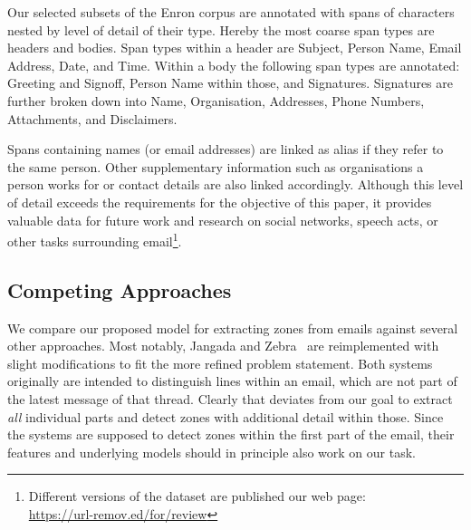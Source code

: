 \documentclass{llncs}
\begin{document}
Our selected subsets of the Enron corpus are annotated with spans of characters nested by level of detail of their type.
Hereby the most coarse span types are headers and bodies.
Span types within a header are Subject, Person Name, Email Address, Date, and Time.
Within a body the following span types are annotated: Greeting and Signoff, Person Name within those, and Signatures. Signatures are further broken down into Name, Organisation, Addresses, Phone Numbers, Attachments, and Disclaimers.

Spans containing names (or email addresses) are linked as alias if they refer to the same person.
Other supplementary information such as organisations a person works for or contact details are also linked accordingly.
Although this level of detail exceeds the requirements for the objective of this paper, it provides valuable data for future work and research on social networks, speech acts, or other tasks surrounding email\footnote{Different versions of the dataset are published our web page:\\ \url{https://url-remov.ed/for/review}}.




\subsection{Competing Approaches}
We compare our proposed model for extracting zones from emails against several other approaches.
Most notably, Jangada and Zebra~\cite{zones,signature} are reimplemented with slight modifications to fit the more refined problem statement.
Both systems originally are intended to distinguish lines within an email, which are not part of the latest message of that thread.
Clearly that deviates from our goal to extract \textit{all} individual parts and detect zones with additional detail within those.
Since the systems are supposed to detect zones within the first part of the email, their features and underlying models should in principle also work on our task.
\end{document}
